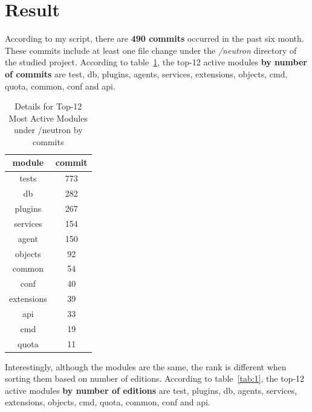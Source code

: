 \documentclass[11pt]{article}
\begin{document}
\section{Result}
According to my script, there are \textbf{490 commits} occurred in the past six month. These commits include at least one file change under the \textit{/neutron} directory of the studied project. According to table~\ref{tab:2}, the top-12 active modules \textbf{by number of commits} are test, db, plugins, agents, services, extensions, objects, cmd, quota, common, conf and api.
\begin{table}[H]
    \centering
    \begin{tabular}{|c||c|}
         \hline
         module & commit \\
         \hline
         tests & 773 \\
         db & 282 \\
         plugins & 267 \\
         services & 154 \\
         agent & 150 \\
         objects & 92 \\
         common & 54 \\
         conf & 40 \\
         extensions & 39 \\
         api & 33 \\
         cmd & 19 \\
         quota & 11\\
         \hline
    \end{tabular}
    \caption{Details for Top-12 Most Active Modules under /neutron by commits}
    \label{tab:2}
\end{table}
Interestingly, although the modules are the same, the rank is different when sorting them based on number of editions. According to table~\ref{tab:1}, the top-12 active modules \textbf{by number of editions} are test, plugins, db, agents, services, extensions, objects, cmd, quota, common, conf and api.
\end{document}
